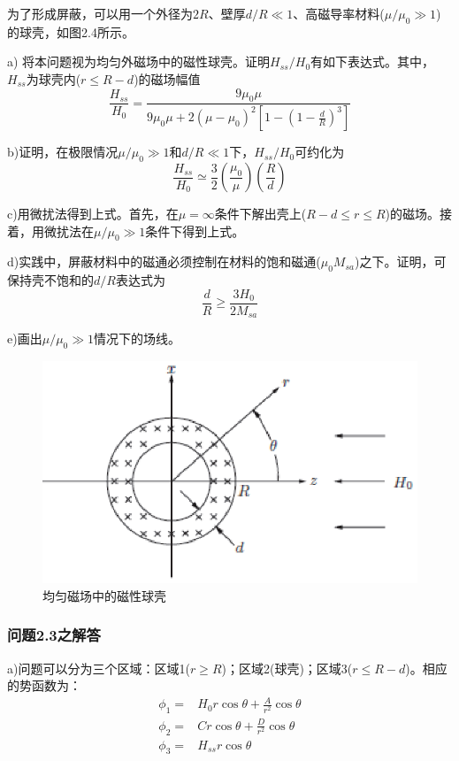 为了形成屏蔽，可以用一个外径为$2R$、壁厚$d/R\ll 1$、高磁导率材料($\mu/\mu_0 \gg 1$)的球壳，如图2.4所示。

a) 将本问题视为均匀外磁场中的磁性球壳。证明$H_{ss}/H_0$有如下表达式。其中，$H_{ss}$为球壳内($r\le R-d$)的磁场幅值
\begin{equation}
\frac{H_{ss}}{H_0}=\frac{9\mu_0 \mu}{9\mu_0 \mu+2(\mu-\mu_0)^2\left[1-\left(1-\frac{d}{R}\right)^3\right]}
\end{equation}

b)证明，在极限情况$\mu/\mu_0\gg 1$和$d/R\ll 1$下，$H_{ss}/H_0$可约化为
\begin{equation}
\frac{H_{ss}}{H_0}\simeq \frac{3}{2}(\frac{\mu_0}{\mu})(\frac{R}{d})
\end{equation}

c)用微扰法得到上式。首先，在$\mu=\infty$条件下解出壳上($R-d\le r\le R$)的磁场。接着，用微扰法在$\mu/\mu_0 \gg 1$条件下得到上式。

d)实践中，屏蔽材料中的磁通必须控制在材料的饱和磁通($\mu_0 M_{sa}$)之下。证明，可保持壳不饱和的$d/R$表达式为
\begin{equation}
\frac{d}{R} \ge \frac{3H_0}{2M_{sa}}
\end{equation}

e)画出$\mu/\mu_0 \gg 1$情况下的场线。

\begin{figure}[htbp]
  \centering
 \includegraphics[scale=0.9]{chpt2/figs/fig2.4.eps}
  \caption{均匀磁场中的磁性球壳}
\end{figure}

\subsubsection*{问题2.3之解答}
a)问题可以分为三个区域：区域1($r\ge R$)；区域2(球壳)；区域3($r\le R-d$)。相应的势函数为：
\begin{align}
  \phi_1 =& H_0 r\cos\theta+\frac{A}{r^2}\cos\theta \tag{S3.1a} \\
  \phi_2 =& C r \cos\theta+\frac{D}{r^2}\cos\theta\tag{S3.1b} \\
  \phi_3 =& H_{ss} r\cos\theta  \tag{S3.1c}
\end{align}

